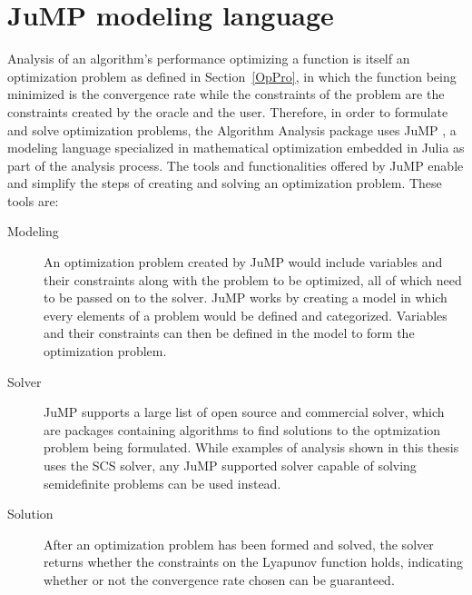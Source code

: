 \section{JuMP modeling language}
Analysis of an algorithm's performance optimizing a function is itself an optimization problem as defined in Section~\ref{OpPro}, in which the function being minimized is the convergence rate while the constraints of the problem are the constraints created by the oracle and the user. Therefore, in order to formulate and solve optimization problems, the Algorithm Analysis package uses JuMP \cite{jump}, a modeling language specialized in mathematical optimization embedded in Julia as part of the analysis process. The tools and functionalities offered by JuMP enable and simplify the steps of creating and solving an optimization problem. These tools are:

\begin{description}
	\item[Modeling] An optimization problem created by JuMP would include variables and their constraints along with the problem to be optimized, all of which need to be passed on to the solver. JuMP works by creating a model in which every elements of a problem would be defined and categorized. Variables and their constraints can then be defined in the model to form the optimization problem.
	\item[Solver] JuMP supports a large list of open source and commercial solver, which are packages containing algorithms to find solutions to the optmization problem being formulated. While examples of analysis shown in this thesis uses the SCS \cite{SCS} solver, any JuMP supported solver capable of solving semidefinite problems can be used instead.
	\item[Solution] After an optimization problem has been formed and solved, the solver returns whether the constraints on the Lyapunov function holds, indicating whether or not the convergence rate chosen can be guaranteed. 	 
\end{description}

